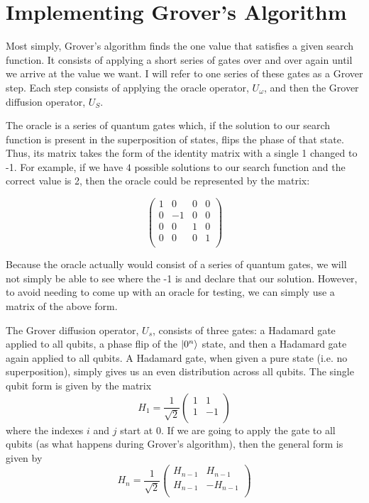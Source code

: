 \documentclass[11pt]{report}
\newcommand{\?}{\stackrel{?}{=}}
\begin{document}
\section{Implementing Grover's Algorithm}

Most simply, Grover's algorithm finds the one value that satisfies a given search function. It consists of applying a short series of gates over and over again until we arrive at the value we want. I will refer to one series of these gates as a Grover step. Each step consists of applying the oracle operator, $U_{\omega}$, and then the Grover diffusion operator, $U_{S}$.

The oracle is a series of quantum gates which, if the solution to our search function is present in the superposition of states, flips the phase of that state. Thus, its matrix takes the form of the identity matrix with a single 1 changed to -1. For example, if we have $4$ possible solutions to our search function and the correct value is 2, then the oracle could be represented by the matrix:

$$\begin{pmatrix}
1 & 0 & 0 & 0 \\
0 & -1 & 0 & 0 \\
0 & 0 & 1 & 0 \\
0 & 0 & 0 & 1 \\
\end{pmatrix}$$

Because the oracle actually would consist of a series of quantum gates, we will not simply be able to see where the -1 is and declare that our solution. However, to avoid needing to come up with an oracle for testing, we can simply use a matrix of the above form.

The Grover diffusion operator, $U_{s}$, consists of three gates: a Hadamard gate applied to all qubits, a phase flip of the $\ket{0^n}$ state, and then a Hadamard gate again applied to all qubits. A Hadamard gate, when given a pure state (i.e. no superposition), simply gives us an even distribution across all qubits. The single qubit form is given by the matrix
$$H_{1}=\frac{1}{\sqrt{2}} \begin{pmatrix}
1 & 1 \\
1 & -1 \\
\end{pmatrix}$$
where the indexes $i$ and $j$ start at 0. If we are going to apply the gate to all qubits (as what happens during Grover's algorithm), then the general form is given by
$$H_{n}=\frac{1}{\sqrt{2}}\begin{pmatrix}
H_{n-1} & H_{n-1} \\
H_{n-1} & -H_{n-1} \\
\end{pmatrix}$$
\end{document}
